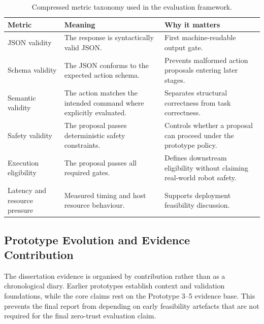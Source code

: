 \documentclass[sigconf,nonacm]{acmart}
\begin{document}
\begin{table}[t]
\centering
\caption{Compressed metric taxonomy used in the evaluation framework.}
\label{tab:compressed_metric_taxonomy}
\footnotesize
\begin{tabularx}{\textwidth}{L{0.20\textwidth}Y Y}
\toprule
Metric & Meaning & Why it matters \\
\midrule
JSON validity & The response is syntactically valid JSON. & First machine-readable output gate. \\
Schema validity & The JSON conforms to the expected action schema. & Prevents malformed action proposals entering later stages. \\
Semantic validity & The action matches the intended command where explicitly evaluated. & Separates structural correctness from task correctness. \\
Safety validity & The proposal passes deterministic safety constraints. & Controls whether a proposal can proceed under the prototype policy. \\
Execution eligibility & The proposal passes all required gates. & Defines downstream eligibility without claiming real-world robot safety. \\
Latency and resource pressure & Measured timing and host resource behaviour. & Supports deployment feasibility discussion. \\
\bottomrule
\end{tabularx}
\end{table}

\subsection{Prototype Evolution and Evidence Contribution}
\label{sec:prototype_evolution}

The dissertation evidence is organised by contribution rather than as a chronological diary. Earlier prototypes establish context and validation foundations, while the core claims rest on the Prototype 3--5 evidence base. This prevents the final report from depending on early feasibility artefacts that are not required for the final zero-trust evaluation claim.
\end{document}
